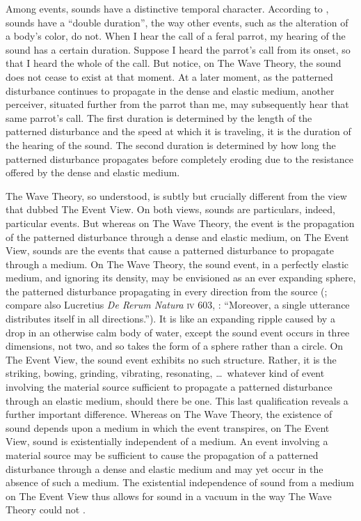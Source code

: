 Among events, sounds have a distinctive temporal character. According to \citet{OShaughnessy:2009aa}, sounds have a ``double duration'', the way other events, such as the alteration of a body's color, do not. When I hear the call of a feral parrot, my hearing of the sound has a certain duration. Suppose I heard the parrot's call from its onset, so that I heard the whole of the call. But notice, on The Wave Theory, the sound does not cease to exist at that moment. At a later moment, as the patterned disturbance continues to propagate in the dense and elastic medium, another perceiver, situated further from the parrot than me, may subsequently hear that same parrot's call. The first duration is determined by the length of the patterned disturbance and the speed at which it is traveling, it is the duration of the hearing of the sound. The second duration is determined by how long the patterned disturbance propagates before completely eroding due to the resistance offered by the dense and elastic medium.

The Wave Theory, so understood, is subtly but crucially different from the view that \citet{OCallaghan:2007xy} dubbed The Event View. On both views, sounds are particulars, indeed, particular events. But whereas on The Wave Theory, the event is the propagation of the patterned disturbance through a dense and elastic medium, on The Event View, sounds are the events that cause a patterned disturbance to propagate through a medium. On The Wave Theory, the sound event, in a perfectly elastic medium, and ignoring its density, may be envisioned as an ever expanding sphere, the patterned disturbance propagating in every direction from the source (\citealt{Sorensen:2009aa}; compare also Lucretius \emph{De Rerum Natura} \textsc{iv} 603, \citealt{Smith:2001aa}: ``Moreover, a single utterance distributes itself in all directions.''). It is like an expanding ripple caused by a drop in an otherwise calm body of water, except the sound event occurs in three dimensions, not two, and so takes the form of a sphere rather than a circle. On The Event View, the sound event exhibits no such structure. Rather, it is the striking, bowing, grinding, vibrating, resonating, \ldots\ whatever kind of event involving the material source sufficient to propagate a patterned disturbance through an elastic medium, should there be one. This last qualification reveals a further important difference. Whereas on The Wave Theory, the existence of sound depends upon a medium in which the event transpires, on The Event View, sound is existentially independent of a medium. An event involving a material source may be sufficient to cause the propagation of a patterned disturbance through a dense and elastic medium and may yet occur in the absence of such a medium. The existential independence of sound from a medium on The Event View thus allows for sound in a vacuum in the way The Wave Theory could not \citep{OCallaghan:2007xy,OCallaghan:2009aa}.

